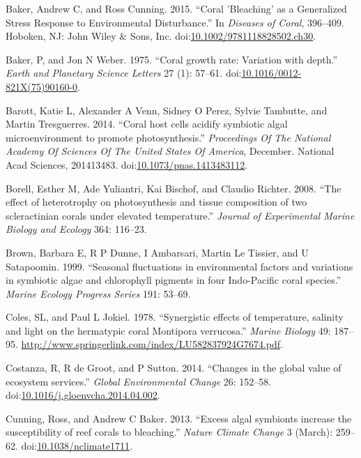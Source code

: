 \documentclass[]{elsarticle} %
\begin{document}
\hypertarget{ref-Baker:2015kp}{}
Baker, Andrew C, and Ross Cunning. 2015. ``Coral 'Bleaching' as a
Generalized Stress Response to Environmental Disturbance.'' In
\emph{Diseases of Coral}, 396--409. Hoboken, NJ: John Wiley \& Sons,
Inc.
doi:\href{https://doi.org/10.1002/9781118828502.ch30}{10.1002/9781118828502.ch30}.

\hypertarget{ref-Baker:1975ip}{}
Baker, P, and Jon N Weber. 1975. ``Coral growth rate: Variation with
depth.'' \emph{Earth and Planetary Science Letters} 27 (1): 57--61.
doi:\href{https://doi.org/10.1016/0012-821X(75)90160-0}{10.1016/0012-821X(75)90160-0}.

\hypertarget{ref-Barott:2014gx}{}
Barott, Katie L, Alexander A Venn, Sidney O Perez, Sylvie Tambutte, and
Martin Tresguerres. 2014. ``Coral host cells acidify symbiotic algal
microenvironment to promote photosynthesis.'' \emph{Proceedings Of The
National Academy Of Sciences Of The United States Of America}, December.
National Acad Sciences, 201413483.
doi:\href{https://doi.org/10.1073/pnas.1413483112}{10.1073/pnas.1413483112}.

\hypertarget{ref-Borell:2008p108}{}
Borell, Esther M, Ade Yuliantri, Kai Bischof, and Claudio Richter. 2008.
``The effect of heterotrophy on photosynthesis and tissue composition of
two scleractinian corals under elevated temperature.'' \emph{Journal of
Experimental Marine Biology and Ecology} 364: 116--23.

\hypertarget{ref-Brown:1999p3534}{}
Brown, Barbara E, R P Dunne, I Ambarsari, Martin Le Tissier, and U
Satapoomin. 1999. ``Seasonal fluctuations in environmental factors and
variations in symbiotic algae and chlorophyll pigments in four
Indo-Pacific coral species.'' \emph{Marine Ecology Progress Series} 191:
53--69.

\hypertarget{ref-Coles:1978p1124}{}
Coles, SL, and Paul L Jokiel. 1978. ``Synergistic effects of
temperature, salinity and light on the hermatypic coral Montipora
verrucosa.'' \emph{Marine Biology} 49: 187--95.
\url{http://www.springerlink.com/index/LU582837924G7674.pdf}.

\hypertarget{ref-Costanza:2014ex}{}
Costanza, R, R de Groot, and P Sutton. 2014. ``Changes in the global
value of ecosystem services.'' \emph{Global Environmental Change} 26:
152--58.
doi:\href{https://doi.org/10.1016/j.gloenvcha.2014.04.002}{10.1016/j.gloenvcha.2014.04.002}.

\hypertarget{ref-Cunning:2013gp}{}
Cunning, Ross, and Andrew C Baker. 2013. ``Excess algal symbionts
increase the susceptibility of reef corals to bleaching.'' \emph{Nature
Climate Change} 3 (March): 259--62.
doi:\href{https://doi.org/10.1038/nclimate1711}{10.1038/nclimate1711}.
\end{document}
